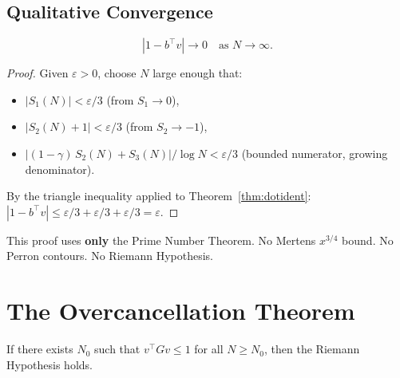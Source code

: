 \documentclass[11pt,a4paper]{article}
\begin{document}
\subsection{Qualitative Convergence}

\begin{theorem}
\label{thm:dotconv}
\[
  |1 - b^\top v| \to 0 \quad \text{as } N \to \infty.
\]
\end{theorem}

\begin{proof}
Given $\varepsilon > 0$, choose $N$ large enough that:
\begin{itemize}
  \item $|S_1(N)| < \varepsilon/3$ (from $S_1 \to 0$),
  \item $|S_2(N) + 1| < \varepsilon/3$ (from $S_2 \to -1$),
  \item $|(1-\gamma)\,S_2(N) + S_3(N)|/\log N < \varepsilon/3$
    (bounded numerator, growing denominator).
\end{itemize}
By the triangle inequality applied to
Theorem~\ref{thm:dotident}:
$|1 - b^\top v| \leq \varepsilon/3 + \varepsilon/3 +
\varepsilon/3 = \varepsilon$.
\end{proof}

\begin{remark}
This proof uses \textbf{only} the Prime Number Theorem. No Mertens
$x^{3/4}$ bound. No Perron contours. No Riemann Hypothesis.
\end{remark}

\section{The Overcancellation Theorem}
\label{sec:overcancellation}

\begin{theorem}
\label{thm:overcancellation}
If there exists $N_0$ such that $v^\top G v \leq 1$ for all
$N \geq N_0$, then the Riemann Hypothesis holds.
\end{theorem}
\end{document}

